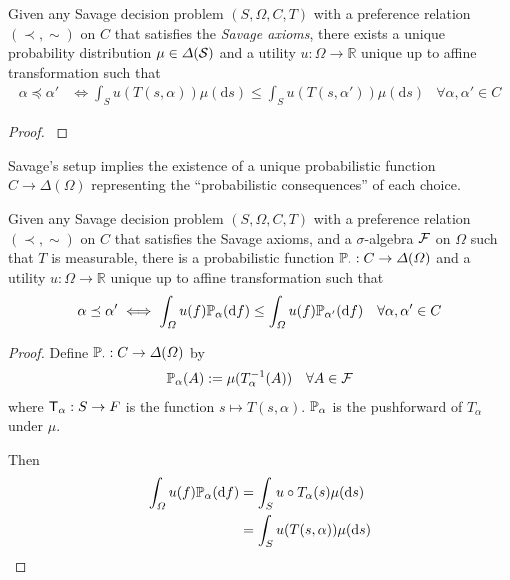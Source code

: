 \begin{theorem}\label{th:savage_representation}
Given any Savage decision problem $(S,\Omega,C,T)$ with a preference relation $(\prec,\sim)$ on $C$ that satisfies the \emph{Savage axioms}, there exists a unique probability distribution $\mu\in\Delta(\mathcal{S})$ and a utility $u:\Omega\to \mathbb{R}$ unique up to affine transformation such that
\begin{align}
    \alpha\preceq \alpha' &\iff \int_S u(T(s,\alpha))\mu(\mathrm{d}s) \leq \int_S u(T(s,\alpha'))\mu(\mathrm{d}s)&\forall \alpha,\alpha'\in C
\end{align}
\end{theorem}

\begin{proof}
\citet{savage_foundations_1954}
\end{proof}

Savage's setup implies the existence of a unique probabilistic function $C\to \Delta(\Omega)$ representing the ``probabilistic consequences'' of each choice.

\begin{theorem}\label{th:sav_pmap}
Given any Savage decision problem $(S,\Omega,C,T)$ with a preference relation $(\prec,\sim)$ on $C$ that satisfies the Savage axioms, and a $\sigma$-algebra $\mathcal{F}$ on $\Omega$ such that $T$ is measurable, there is a probabilistic function $\mathbb{P}_{\cdot}:C\to \Delta(\Omega)$ and a utility $u:\Omega\to \mathbb{R}$ unique up to affine transformation such that
\begin{align}
    \alpha\preceq \alpha' &\iff \int_\Omega u(f)\mathbb{P}_\alpha(\mathrm{d}f) \leq \int_\Omega u(f)\mathbb{P}_{\alpha'}(\mathrm{d}f)&\forall \alpha,\alpha'\in C
\end{align}
\end{theorem}

\begin{proof}
Define $\mathbb{P}_\cdot:C\to \Delta(\Omega)$ by
\begin{align}
    \mathbb{P}_\alpha(A) &:= \mu (T_\alpha^{-1}(A))&\forall A\in \mathcal{F}
\end{align}
where $\mathsf{T}_\alpha:S\to F$ is the function $s\mapsto T(s,\alpha)$. $\mathbb{P}_\alpha$ is the pushforward of $T_\alpha$ under $\mu$.

Then 
\begin{align}
    \int_\Omega u(f)\mathbb{P}_\alpha(\mathrm{d}f) &= \int_S u \circ T_\alpha (s)\mu(\mathrm{d}s)\\
    &= \int_S u(T(s,\alpha))\mu(\mathrm{d}s)
\end{align}
\end{proof}

